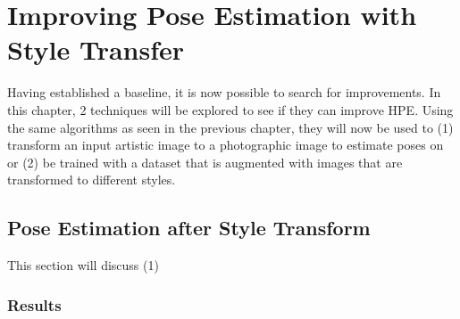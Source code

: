 \chapter{Improving Pose Estimation with Style Transfer}
\label{chap:improvements}
Having established a baseline, it is now possible to search for improvements.
In this chapter, 2 techniques will be explored to see if they can improve \gls{HPE}.
Using the same algorithms as seen in the previous chapter, they will now be used to
(1) transform an input artistic image to a photographic image to estimate poses on or
(2) be trained with a dataset that is augmented with images that are transformed to different styles.

\section{Pose Estimation after Style Transform}
This section will discuss (1)

\subsection{Results}

